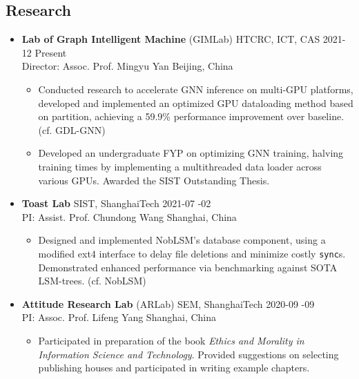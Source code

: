 \documentclass[a4paper,10pt]{ctexart} %
\begin{document}
\begin{keepsection}
\subsection{Research}
\begin{itemize}
    \item \textbf{Lab of Graph Intelligent Machine} (GIMLab) \quad HTCRC, ICT, CAS \hfill 2021-12 \datetlide Present \\
    {\small Director: Assoc. Prof. Mingyu Yan} \hfill Beijing, China
    \begin{small}
        \begin{itemize}
            \item Conducted research to accelerate GNN inference on multi-GPU platforms, developed and implemented an optimized GPU dataloading method based on partition, achieving a 59.9\% performance improvement over baseline. (cf. GDL-GNN)
            \item Developed an undergraduate FYP on optimizing GNN training, halving training times by implementing a multithreaded data loader across various GPUs. Awarded the SIST Outstanding Thesis.
        \end{itemize}
    \end{small}

    \item \textbf{Toast Lab} \quad SIST, ShanghaiTech \hfill 2021-07 -02 \\
    {\small PI: Assist. Prof. Chundong Wang} \hfill Shanghai, China
    \begin{small}
        \begin{itemize}
            \item Designed and implemented NobLSM's database component, using a modified ext4 interface to delay file deletions and minimize costly \texttt{sync}s. Demonstrated enhanced performance via benchmarking against SOTA LSM-trees. (cf. NobLSM)
        \end{itemize}
    \end{small}

    \item \textbf{Attitude Research Lab} (ARLab) \quad SEM, ShanghaiTech \hfill 2020-09 -09 \\
    {\small PI: Assoc. Prof. Lifeng Yang} \hfill Shanghai, China
    \begin{small}
        \begin{itemize}
            \item Participated in preparation of the book \textit{Ethics and Morality in Information Science and Technology}. Provided suggestions on selecting publishing houses and participated in writing example chapters.
        \end{itemize}
    \end{small}
\end{itemize}
\end{keepsection}
\end{document}
